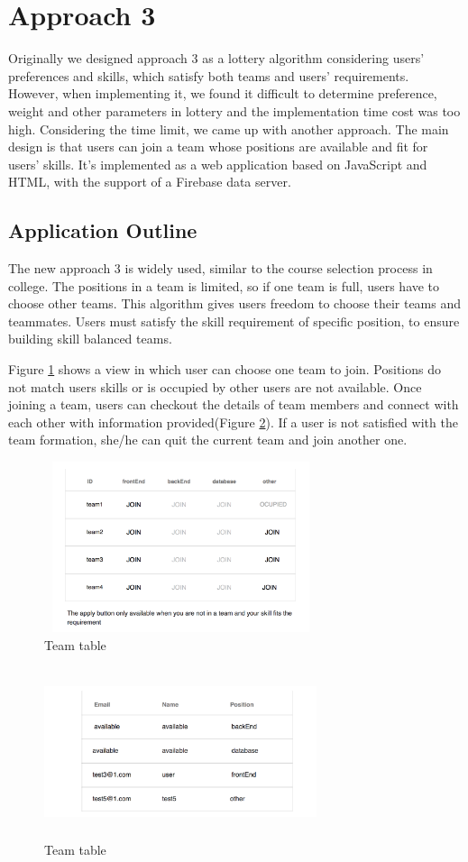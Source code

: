 \documentclass[conference]{IEEEtran}
\begin{document}
\section{Approach 3}
Originally we designed approach 3 as a lottery algorithm considering users' preferences and skills, which satisfy both teams and users' requirements. However, when implementing it, we found it difficult to determine preference, weight and other parameters in lottery and the implementation time cost was too high. Considering the time limit, we came up with another approach. The main design is that users can join a team whose positions are available and fit for users' skills. It's implemented as a web application based on JavaScript and HTML, with the support of a Firebase data server.

\subsection{Application Outline}
The new approach 3 is widely used, similar to the course selection process in college. The positions in a team is limited, so if one team is full, users have to choose other teams. This algorithm gives users freedom to choose their teams and teammates. Users must satisfy the skill requirement of specific position, to ensure building skill balanced teams.

Figure \ref{teams} shows a view in which user can choose one team to join. Positions do not match users skills or is occupied by other users are not available. Once joining a team, users can checkout the details of team members and connect with each other with information provided(Figure \ref{team_info}). If a user is not satisfied with the team formation, she/he can quit the current team and join another one.

\begin{figure}[H]
  \includegraphics[width=8cm,height=5cm]{image/app3-teams.png}
  \caption{Team table}
  \label{teams}
\end{figure}
\begin{figure}[H]
  \includegraphics[width=8cm,height=5cm]{image/app3-teaminfo.png}
  \caption{Team table}
  \label{team_info}
\end{figure}
\end{document}
